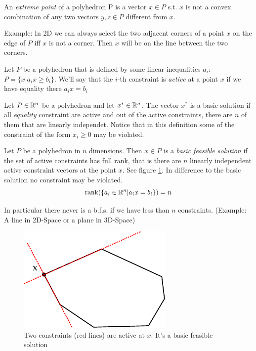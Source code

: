\begin{Def}\label{Def:ExtremePoint} An \emph{extreme point} of a polyhedron P is a vector $x\in P$ s.t. $x$ is not a convex combination of any two vectors $y,z\in P$ different from $x$. 
\end{Def}
Example: In 2D we can always select the two adjacent corners of a point $x$ on the edge of $P$ iff $x$ is not a corner. Then $x$ will be on the line between the two corners. 

\begin{Def}\label{Def:ActiveConstraint} Let $P$ be a polyhedron that is defined by some linear inequalities $a_i$: $P=\{x|a_ix\geq b_i\}$. We'll say that the $i$-th constraint is \emph{active} at a point $x$ if we have equality there $a_ix = b_i$
\end{Def}

\begin{Def}\label{Def:BasicSolution}Let $P\in \mathbb{R}^n$ be a polyhedron and let $x^{*}\in \mathbb{R}^n$. The vector $x^{*}$ is a basic solution if all \emph{equality} constraint are active and out of the active constraints, there are $n$ of them that are linearly independet. Notice that in this definition some of the constraint of the form $x_i \geq 0$ may be violated.
\end{Def}

\begin{Def}\label{Def:BFS} Let $P$ be a polyhedron in $n$ dimensions. Then $x\in P$ is a \emph{basic feasible solution} if the set of active constraints has full rank, that is there are $n$ linearly independent active constraint vectors at the point $x$. See figure \ref{Fig:bfsActiveConstraints}. In difference to the basic solution no constraint may be violated.
\[\mbox{rank}(\{a_i\in \mathbb{R}^n|a_ix=b_i\}) = n\]

In particular there never is a b.f.s. if we have less than $n$ constraints. (Example: A line in 2D-Space or a plane in 3D-Space)
\end{Def}

\begin{figure}[hbt]
\begin{center}
\includegraphics{./images/bfs.pdf}
\end{center}
\caption{Two constraints (red lines) are active at $x$. It's a basic feasible solution}
\label{Fig:bfsActiveConstraints}
\end{figure}

